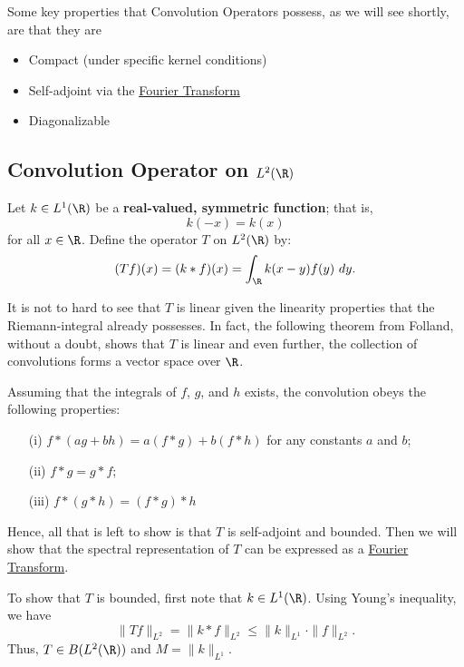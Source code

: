 Some key properties that Convolution Operators possess, as we will see shortly, are that they are 
\begin{itemize}
    \item Compact (under specific kernel conditions)
    \item Self-adjoint via the {\hyperref[Fourier Transform]{Fourier Transform}} 
    \item Diagonalizable
\end{itemize}


\subsection{Convolution Operator on \( L^2(\R) \)}

   Let \( k \in L^{1}(\R) \) be a \textbf{real-valued, symmetric function}; that is,  
   \[  k(-x) = k(x)  \]
   for all \( x \in \R \). Define the operator \( T  \) on \( L^{2}(\R) \) by:
   \[  (Tf)(x) = (k * f)(x) = \int_{ \R } k (x-y) f(y) \ dy. \]

   It is not to hard to see that \( T  \) is linear given the linearity properties that the Riemann-integral already possesses. In fact, the following theorem from \cite{Folland} Folland, 
without a doubt, shows that \( T  \) is linear and even further, the collection of convolutions forms a vector space over \( \R  \).

\begin{theorem}
   Assuming that the integrals of \( f  \), \( g  \), and \( h \) exists, the convolution obeys the following properties:
   \begin{enumerate}
       \item[(i)] \( f * (ag+ bh) = a (f * g) + b (f * h) \) for any constants \( a \) and \( b \);
       \item[(ii)] \( f * g = g * f  \);
        \item[(iii)] \( f * (g * h) = (f * g) * h \)
   \end{enumerate}
\end{theorem}

   Hence, all that is left to show is that \( T  \) is self-adjoint and bounded. Then we will show that the spectral representation of \( T  \) can be expressed as a {\hyperref[Fourier Transform]{Fourier Transform}}.  

   To show that \( T  \) is bounded, first note that \( k \in L^{1}(\R) \). Using Young's inequality, we have 
   \[  \|T f \|_{L^{2}} = \|k * f\|_{L^{2}} \leq \|k\|_{L^{1}} \cdot \|f\|_{L^{2}}.  \]
   Thus, \( T \in B(L^{2}(\R)) \) and \( M = \|k\|_{L^{1}} \).

